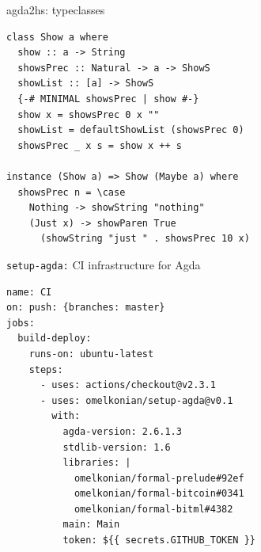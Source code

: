 \documentclass[aspectratio=43]{beamer}
\makeatletter
\newcommand\citeagda{%
\textbf{CPP @ POPL'22}\\
\small{Reasonable Agda is Correct Haskell: Intrinsic Program Verification using \textsc{agda2Hs}}\\
\scriptsize{\textit{J.Cockx, O.Melkonian, J.Chapman, U.Norell + TU Delft students}}
}
\makeatother
\begin{document}
\setlength{\AgdaEmptySkip}{0em}
\renewcommand{\AgdaCodeStyle}{\tiny}
\begin{frame}[fragile]{agda2hs: typeclasses}
\begin{minipage}[l]{.4\textwidth}
\agdaClasses{}
\end{minipage}
\hfill\vline\hfill
\begin{minipage}[r]{.5\textwidth}
\begin{verbatim}
class Show a where
  show :: a -> String
  showsPrec :: Natural -> a -> ShowS
  showList :: [a] -> ShowS
  {-# MINIMAL showsPrec | show #-}
  show x = showsPrec 0 x ""
  showList = defaultShowList (showsPrec 0)
  showsPrec _ x s = show x ++ s

instance (Show a) => Show (Maybe a) where
  showsPrec n = \case
    Nothing -> showString "nothing"
    (Just x) -> showParen True
      (showString "just " . showsPrec 10 x)
\end{verbatim}
\end{minipage}
\pause
\begin{center}
\end{center}
\end{frame}

\begin{frame}[fragile]{\texttt{setup-agda:} CI infrastructure for Agda}
\begin{verbatim}
name: CI
on: push: {branches: master}
jobs:
  build-deploy:
    runs-on: ubuntu-latest
    steps:
      - uses: actions/checkout@v2.3.1
      - uses: omelkonian/setup-agda@v0.1
        with:
          agda-version: 2.6.1.3
          stdlib-version: 1.6
          libraries: |
            omelkonian/formal-prelude#92ef
            omelkonian/formal-bitcoin#0341
            omelkonian/formal-bitml#4382
          main: Main
          token: ${{ secrets.GITHUB_TOKEN }}
\end{verbatim}
\end{frame}
\end{document}
